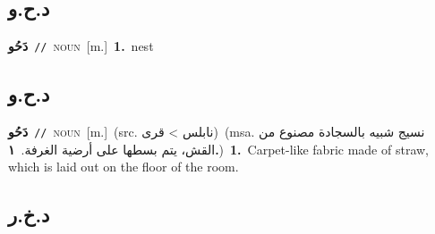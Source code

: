 \documentclass[10pt,a4paper,twoside]{article} %
\begin{document}
\begin{multicols}{2}
\vspace{-3mm}
\subsection*{\color{blue}\foreignlanguage{arabic}{د.ح.و}\color{blue}{}} 

{\setlength\topsep{0pt}\textbf{\foreignlanguage{arabic}{دَحُو}}\ {\color{gray}\texttt{//}\color{black}}\ \textsc{noun}\ [m.]\ \textbf{1.}~nest\ } \vspace{2mm}

\vspace{-3mm}
\subsection*{\color{blue}\foreignlanguage{arabic}{د.ح.و}\color{blue}{ (ntws)}} 

{\setlength\topsep{0pt}\textbf{\foreignlanguage{arabic}{دَحُو}}\ {\color{gray}\texttt{//}\color{black}}\ \textsc{noun}\ [m.]\ (src. \color{gray}\foreignlanguage{arabic}{نابلس > قرى}\color{black})\ \color{gray}(msa. \foreignlanguage{arabic}{نسيج شبيه بالسجادة مصنوع من القش، يتم بسطها على أرضية الغرفة.}~\foreignlanguage{arabic}{\textbf{١.}})\color{black}\ \textbf{1.}~Carpet-like fabric made of straw, which is laid out on the floor of the room.\ } \vspace{2mm}

\vspace{-3mm}
\subsection*{\color{blue}\foreignlanguage{arabic}{د.خ.ر}\color{blue}{}} 


\end{multicols}
\end{document}
